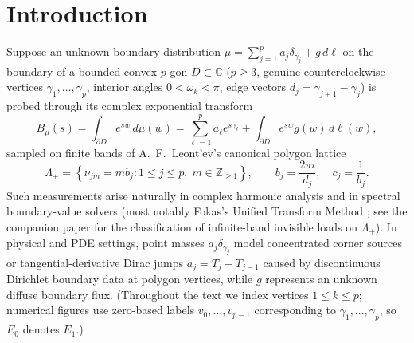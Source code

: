 \documentclass[11pt,reqno]{amsart}
\theoremstyle{definition}
\theoremstyle{remark}
\newcommand{\C}{\mathbb{C}}
\newcommand{\Z}{\mathbb{Z}}
\begin{document}
\maketitle

\section{Introduction}

Suppose an unknown boundary distribution $\mu = \sum_{j=1}^p a_j \delta_{\gamma_j} + g\,d\ell$ on the boundary of a bounded convex $p$-gon $D \subset \C$ ($p \ge 3$, genuine counterclockwise vertices $\gamma_1,\dots,\gamma_p$, interior angles $0 < \omega_k < \pi$, edge vectors $d_j = \gamma_{j+1}-\gamma_j$) is probed through its complex exponential transform
\begin{equation}\label{eq:B-transform}
  B_\mu(s) = \int_{\partial D} e^{sw}\,d\mu(w) = \sum_{\ell=1}^p a_\ell e^{s\gamma_\ell} + \int_{\partial D} e^{sw} g(w)\,d\ell(w),
\end{equation}
sampled on finite bands of A.~F.~Leont'ev's canonical polygon lattice \cite{Leontev1974Polygon,Leontev1976Book,Leontev1987TrMIAN}
\begin{equation}\label{eq:lattice}
  \Lambda_+ = \left\{ \nu_{jm} = m b_j : 1 \le j \le p,\; m \in \Z_{\ge 1} \right\},
  \qquad b_j = \frac{2\pi i}{d_j}, \quad c_j = \frac{1}{b_j}.
\end{equation}
Such measurements arise naturally in complex harmonic analysis and in spectral boundary-value solvers (most notably Fokas's Unified Transform Method \cite{FFX2004,Ashton2012,AshtonFokas2013}; see the companion paper \cite{Paper1} for the classification of infinite-band invisible loads on $\Lambda_+$). In physical and PDE settings, point masses $a_j \delta_{\gamma_j}$ model concentrated corner sources or tangential-derivative Dirac jumps $a_j = T_j - T_{j-1}$ caused by discontinuous Dirichlet boundary data at polygon vertices, while $g$ represents an unknown diffuse boundary flux. (Throughout the text we index vertices $1 \le k \le p$; numerical figures use zero-based labels $v_0,\dots,v_{p-1}$ corresponding to $\gamma_1,\dots,\gamma_p$, so $E_0$ denotes $E_1$.)
\end{document}
